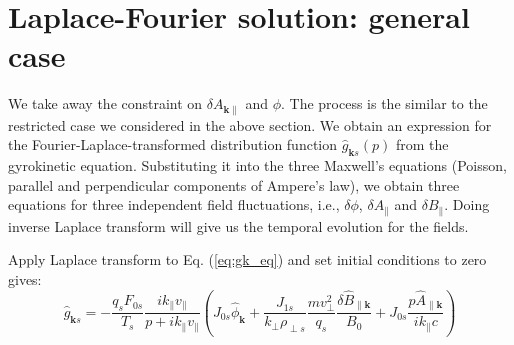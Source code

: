 \documentclass[12pt]{article}
\begin{document}
\section{Laplace-Fourier solution: general case}
We take away the constraint on $\delta A_{\mathbf{k}\parallel}$ and $\phi$. The process is the similar to the restricted case we considered in the above section. We obtain an expression for the Fourier-Laplace-transformed distribution function $\hat{g}_{\mathbf{k}s}(p)$ from the gyrokinetic equation. Substituting it into the three Maxwell's equations (Poisson, parallel and perpendicular components of Ampere's law), we obtain three equations for three independent field fluctuations, i.e., $\delta \phi$, $\delta A_\parallel$ and $\delta B_\parallel$. Doing inverse Laplace transform will give us the temporal evolution for the fields.

Apply Laplace transform to Eq. (\ref{eq:gk_eq}) and set initial conditions to zero gives:
%
\begin{equation}
\hat{g}_{\mathbf{k}s}= - \frac{q_sF_{0s}}{T_s} \frac{ik_\parallel v_\parallel}{p+ik_\parallel v_\parallel} \left(
J_{0s} \hat{\phi}_{\mathbf{k}} + \frac{J_{1s}}{k_\perp \rho_{\perp s}} \frac{mv_\perp^2}{q_s} \frac{\delta \hat{B}_{\parallel \mathbf{k}}}
{B_0} + J_{0s}\frac{p \hat{A}_{\parallel \mathbf{k}}}{ik_\parallel c}\right)
\label{eq:lt_gk_general}
\end{equation}
\end{document}
